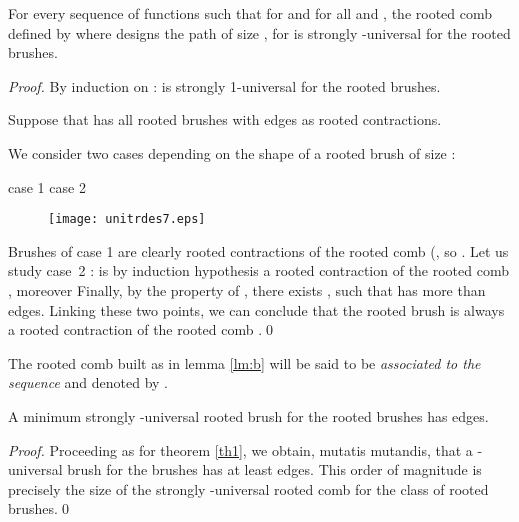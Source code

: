 \documentclass{llncs}
\begin{document}
\begin{lemma}\label{lm:b} For every sequence 
of functions such that  for  and  for all  and , the rooted comb defined by  where  designs the path of size , for
 is strongly -universal for the rooted brushes.
\end{lemma}




\begin{proof} By induction on  :  is strongly
1-universal for the rooted brushes.

Suppose that  has all rooted brushes with  edges
as rooted contractions.

We consider two cases depending on the shape of a rooted brush  of size
 :

\hspace{1.7cm} case 1 \hspace{4cm} case 2
\begin{figure}[htbp]
\centerline{\texttt{[image: unitrdes7.eps]}}
\end{figure}


Brushes of case 1 are clearly rooted contractions of the rooted
comb  (, so . Let us study case~2 :  is by induction hypothesis
a rooted contraction of the rooted comb ,
moreover  Finally, by the property of , there exists , such that  has more than 
edges. Linking these two points, we can conclude that the rooted
brush  is always a rooted contraction of the rooted comb
.\qed
\end{proof}





The rooted comb built as in lemma \ref{lm:b} will be said to be
\textit{associated to the sequence}  and denoted by .





\begin{theorem} A minimum strongly -universal rooted brush for the
rooted brushes has  edges.
\end{theorem}




\begin{proof} Proceeding as for theorem \ref{th1}, we obtain, mutatis mutandis, that a
-universal brush for the brushes has at least 
edges. This order of magnitude is precisely the size of the
strongly -universal rooted comb  for the class of
rooted brushes.\qed
\end{proof}
\end{document}
